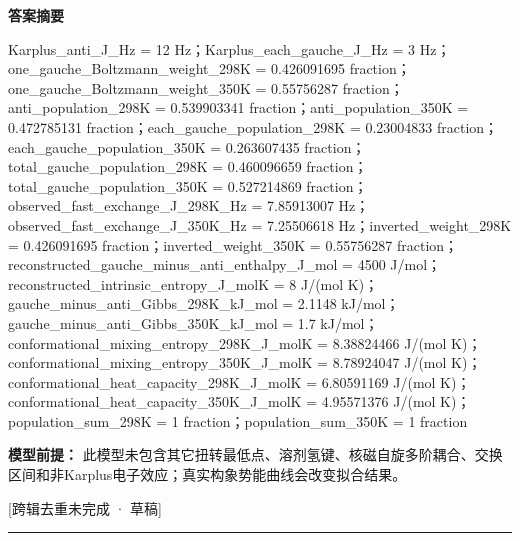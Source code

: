 \documentclass[UTF8,11pt,a4paper]{ctexart}
\begin{document}
\noindent\textbf{答案摘要}\par
Karplus\_anti\_J\_Hz = 12 Hz；Karplus\_each\_gauche\_J\_Hz = 3 Hz；one\_gauche\_Boltzmann\_weight\_298K = 0.426091695 fraction；one\_gauche\_Boltzmann\_weight\_350K = 0.55756287 fraction；anti\_population\_298K = 0.539903341 fraction；anti\_population\_350K = 0.472785131 fraction；each\_gauche\_population\_298K = 0.23004833 fraction；each\_gauche\_population\_350K = 0.263607435 fraction；total\_gauche\_population\_298K = 0.460096659 fraction；total\_gauche\_population\_350K = 0.527214869 fraction；observed\_fast\_exchange\_J\_298K\_Hz = 7.85913007 Hz；observed\_fast\_exchange\_J\_350K\_Hz = 7.25506618 Hz；inverted\_weight\_298K = 0.426091695 fraction；inverted\_weight\_350K = 0.55756287 fraction；reconstructed\_gauche\_minus\_anti\_enthalpy\_J\_mol = 4500 J/mol；reconstructed\_intrinsic\_entropy\_J\_molK = 8 J/(mol K)；gauche\_minus\_anti\_Gibbs\_298K\_kJ\_mol = 2.1148 kJ/mol；gauche\_minus\_anti\_Gibbs\_350K\_kJ\_mol = 1.7 kJ/mol；conformational\_mixing\_entropy\_298K\_J\_molK = 8.38824466 J/(mol K)；conformational\_mixing\_entropy\_350K\_J\_molK = 8.78924047 J/(mol K)；conformational\_heat\_capacity\_298K\_J\_molK = 6.80591169 J/(mol K)；conformational\_heat\_capacity\_350K\_J\_molK = 4.95571376 J/(mol K)；population\_sum\_298K = 1 fraction；population\_sum\_350K = 1 fraction\par
\noindent\textbf{模型前提：}
此模型未包含其它扭转最低点、溶剂氢键、核磁自旋多阶耦合、交换区间和非Karplus电子效应；真实构象势能曲线会改变拟合结果。\par
\noindent\textcolor{red!65!black}{[跨辑去重未完成 · 草稿]} \par
\medskip\hrule\medskip
{}
\end{document}
